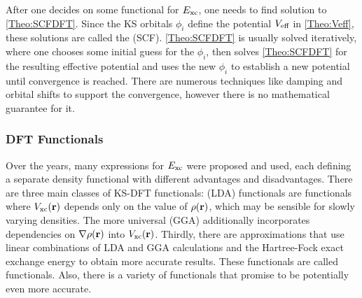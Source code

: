 After one decides on some functional for $E_{\text{xc}}$, one needs to find  solution
to \eqref{Theo:SCFDFT}. Since the KS orbitals $\phi_i$ define the potential $V_{\text{eff}}$ in
\eqref{Theo:Veff}, these solutions are called the  (SCF). 
\eqref{Theo:SCFDFT} is usually solved iteratively, where one chooses some initial guess
for the $\phi_i$, then solves \eqref{Theo:SCFDFT} for the resulting effective potential
and uses the new $\phi_i$ to establish a new potential until convergence is reached.
There are numerous techniques like damping and orbital shifts to support the
convergence, however there is no mathematical guarantee for it. 


\subsubsection{DFT Functionals}
\label{Sec:Theo:Functionals}
Over the years, many expressions for $E_{\text{xc}}$ were proposed and used, each
defining a separate density functional with different advantages and disadvantages. There
are three main classes of KS-DFT functionals:  (LDA) functionals
are functionals where $V_{\text{xc}}(\mathbf{r})$ depends only on the value of $\rho(\mathbf{r})$,
which may be sensible for slowly varying densities. The more universal  (GGA) additionally incorporates dependencies on $\nabla\rho(\mathbf{r})$ into $V_{\text{xc}}(\mathbf{r})$. Thirdly,
there are approximations that use linear combinations of LDA and GGA calculations and the
Hartree-Fock exact exchange energy to obtain more accurate results.\cite{Becke1993}
These functionals are called  functionals. Also, there is a variety
of  functionals that promise to be potentially even more
accurate.

